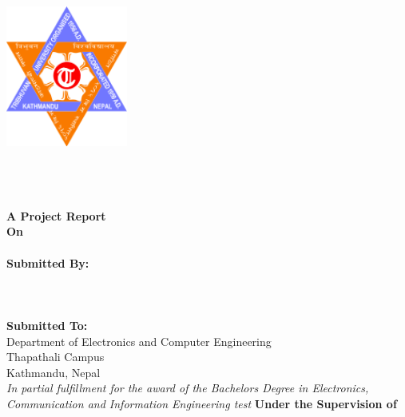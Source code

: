 \begin{titlepage}
   \begin{center}
   	\begin{spacing}{1.5}
   	\includegraphics[width=4cm]{images/logo.png}
   
    \vspace{5mm} 
	\textbf{\MakeUppercase{\cUniversity}}\\
	\textbf{\MakeUppercase{\cDepartment} }\\
	\textbf{\MakeUppercase{\cCampus}} \\
	\vfill
	\textbf{A Project Report \\ On \\ }
	\textbf{\MakeUppercase{\cTitle}}\\
	\vfill
	\textbf{Submitted By:} \\
	\cSubmittedI \\
	\cSubmittedII \\
	\cSubmittedIII \\
	\vfill
	\textbf{Submitted To:} \\
	Department of Electronics and Computer Engineering \\ Thapathali Campus \\ Kathmandu, Nepal \\
	\vfill
    \textit{In partial fulfillment for the award of the Bachelors Degree in Electronics, Communication and Information Engineering test}
    \vfill
    \textbf{Under the Supervision of} \\
    \cSupervisor \\
    \vfill
    \cDate 
    \end{spacing}
    \end{center}
\end{titlepage}
